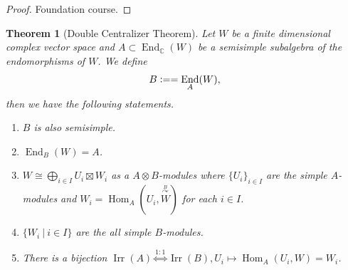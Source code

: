 \documentclass[10pt]{article}
\newtheorem{theorem}{Theorem} [section]
\numberwithin{equation}{theorem}
\DeclareMathOperator{\End}{End}
\DeclareMathOperator{\Irr}{Irr}
\DeclareMathOperator{\Hom}{Hom}
\newcommand{\defeq}{\vcentcolon=}
\newcommand{\C}[0]{\mathbb{C}}
\newcommand{\sep}[0]{\:|\:}
\begin{document}
\begin{proof}
  Foundation course.
\end{proof}
\begin{theorem}[Double Centralizer Theorem]
  \label{theorem_43}
  Let $W$ be a finite dimensional complex vector space and $A\subset\End_\C(W)$ be a semisimple subalgebra of the endomorphisms of $W$.
  We define 
  \begin{equation*}
    B\defeq = \End_A(W),
  \end{equation*}
  then we have the following statements.
  \begin{enumerate}[1).]
    \item $B$ is also semisimple.
    \item $\End_B(W) = A$.
    \item $W\cong\bigoplus_{i\in I}U_i\boxtimes W_i$ as a $A\otimes B$-modules where $\{U_i\}_{i\in I}$ are the simple $A$-modules and $W_i = \Hom_A(U_i,\stackrel{\stackrel{B}{\curvearrowright}}{W})$ for each $i\in I$.
    \item $\{W_i\sep i\in I\}$ are the all simple $B$-modules.
    \item There is a bijection $\Irr(A)\stackrel{1:1}{\Leftrightarrow}\Irr(B),U_i\mapsto \Hom_A(U_i,W) = W_i$.
  \end{enumerate}
\end{theorem}
\end{document}
